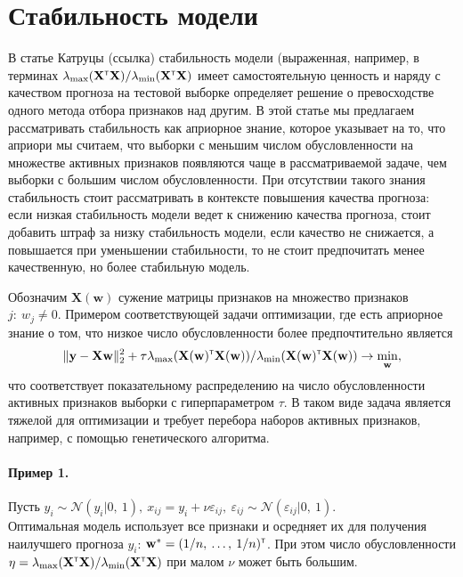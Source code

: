 \documentclass[12pt, a4paper]{article}
\newcommand{\T}{{\text{\tiny\sffamily\upshape\mdseries T}}}
\newcommand{\xmatr}{\mathbf{X}}
\newcommand{\norm}{\mathcal{N}}
\newcommand{\yvec}{\mathbf{y}}
\newcommand{\wvec}{\mathbf{w}}
\begin{document}
\section*{Стабильность модели}
В статье Катруцы (ссылка) стабильность модели (выраженная, например, в терминах $\lambda_{\max}(\xmatr^{\T}\xmatr) / \lambda_{\min}(\xmatr^{\T}\xmatr)$ имеет самостоятельную ценность и наряду с качеством прогноза на тестовой выборке определяет решение о превосходстве одного метода отбора признаков над другим. В этой статье мы предлагаем рассматривать стабильность как априорное знание, которое указывает на то, что априори мы считаем, что выборки с меньшим числом обусловленности на множестве активных признаков появляются чаще в рассматриваемой задаче, чем выборки с большим числом обусловленности. При отсутствии такого знания стабильность стоит рассматривать в контексте повышения качества прогноза: если низкая стабильность модели ведет к снижению качества прогноза, стоит добавить штраф за низку стабильность модели, если качество не снижается, а повышается при уменьшении стабильности, то не стоит предпочитать менее качественную, но более стабильную модель. 

Обозначим $\xmatr(\wvec)$ сужение матрицы признаков на множество признаков $j:\:w_j \neq 0$. Примером соответствующей задачи оптимизации, где есть априорное знание о том, что низкое число обусловленности более предпочтительно является
$$
\|\yvec - \xmatr \wvec\|_2^2 + \tau \lambda_{\max}(\xmatr(\wvec)^{\T}\xmatr(\wvec)) / \lambda_{\min}(\xmatr(\wvec)^{\T}\xmatr(\wvec)) \to \min_{\wvec},
$$
что соответствует показательному распределению на число обусловленности активных признаков выборки с гиперпараметром $\tau$. В таком виде задача является тяжелой для оптимизации и требует перебора наборов активных признаков, например, с помощью генетического алгоритма.

\paragraph*{Пример 1.} Пусть $y_i \sim \norm(y_i|0,\:1),\:x_{ij} = y_i + \nu \varepsilon_{ij},\:\varepsilon_{ij} \sim \norm(\varepsilon_{ij}|0,\:1)$. \\
Оптимальная модель использует все признаки и осредняет их для получения наилучшего прогноза $y_i$: $\wvec^* = (1 / n,\:\ldots,\:1 / n)^{\T}$. При этом число обусловленности $\eta = \lambda_{\max}(\xmatr^{\T}\xmatr) / \lambda_{\min}(\xmatr^{\T}\xmatr)$ при малом $\nu$ может быть большим.
\end{document}
